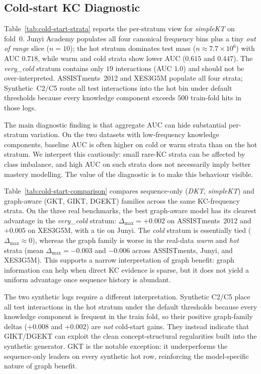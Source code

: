 \documentclass[pdflatex,sn-basic]{sn-jnl}
\newcommand{\KC}{knowledge component}
\newcommand{\KCs}{knowledge components}
\begin{document}
\subsection{Cold-start KC Diagnostic}
\label{sec:exp-coldstart}

Table~\ref{tab:cold-start-strata} reports the per-stratum view for
\textit{simpleKT} on fold~0. Junyi Academy populates all four canonical
frequency bins plus a tiny \emph{out of range} slice ($n{=}10$); the
hot stratum dominates test mass ($n{\approx}7.7\times10^6$) with AUC
$0.718$, while warm and cold strata show lower AUC ($0.615$ and
$0.447$). The \emph{very\_cold} stratum contains only $19$ interactions
(AUC $1.0$) and should not be over-interpreted. ASSISTments~2012 and
XES3G5M populate all four strata; Synthetic~C2/C5 route all test
interactions into the hot bin under default thresholds because every
\KC{} exceeds $500$ train-fold hits in those logs.

The main diagnostic finding is that aggregate AUC can hide substantial
per-stratum variation. On the two datasets with low-frequency \KCs{},
baseline AUC is often higher on cold or warm strata than on the hot
stratum. We interpret this cautiously: small rare-KC strata can be
affected by class imbalance, and high AUC on such strata does not
necessarily imply better mastery modelling. The value of the diagnostic
is to make this behaviour visible.


Table~\ref{tab:cold-start-comparison} compares sequence-only
(\textit{DKT}, \textit{simpleKT}) and graph-aware (GKT, GIKT, DGEKT)
families across the same KC-frequency strata. On the three real
benchmarks, the best graph-aware model has its clearest advantage in
the \emph{very\_cold} stratum: $\Delta_{\max}=+0.002$ on
ASSISTments~2012 and $+0.005$ on XES3G5M, with a tie on Junyi. The
\emph{cold} stratum is essentially tied ($\Delta_{\max}\approx0$),
whereas the graph family is worse in the real-data \emph{warm} and
\emph{hot} strata (mean $\Delta_{\max}=-0.003$ and $-0.006$ across
ASSISTments, Junyi, and XES3G5M). This supports a narrow interpretation
of graph benefit: graph information can help when direct KC evidence is
sparse, but it does not yield a uniform advantage once sequence history
is abundant.

The two synthetic logs require a different interpretation. Synthetic
C2/C5 place all test interactions in the hot stratum under the default
thresholds because every \KC{} is frequent in the train fold, so their
positive graph-family deltas ($+0.008$ and $+0.002$) are \emph{not}
cold-start gains. They instead indicate that GIKT/DGEKT can exploit the
clean concept-structural regularities built into the synthetic
generator. GKT is the notable exception: it underperforms the
sequence-only leaders on every synthetic hot row, reinforcing the
model-specific nature of graph benefit.
\end{document}
